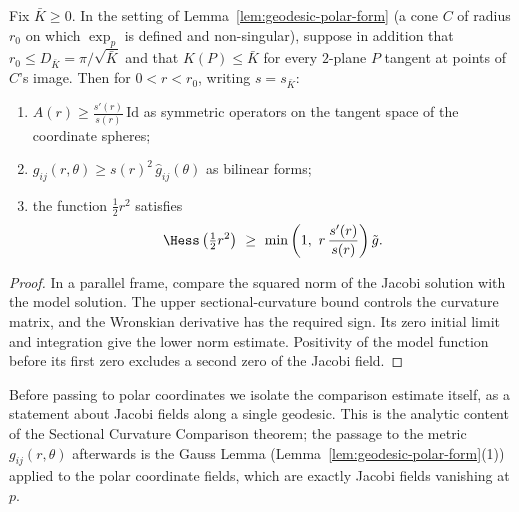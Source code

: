 \begin{lemma}
\label{lem:rauch-lower}

Fix $\bar K\ge0$. In the setting of
Lemma~\ref{lem:geodesic-polar-form} (a cone $C$ of radius $r_0$ on
which $\exp_p$ is defined and non-singular), suppose in addition
that $r_0\le D_{\bar K}=\pi/\sqrt{\bar K}$ and that $K(P)\le\bar K$
for every $2$-plane $P$ tangent at points of $C$'s image. Then for
$0<r<r_0$, writing $s=s_{\bar K}$:
\begin{enumerate}
\item $A(r)\ge\frac{s'(r)}{s(r)}\,\mathrm{Id}$ as symmetric
operators on the tangent space of the coordinate spheres;
\item $g_{ij}(r,\theta)\ge s(r)^2\,\hat g_{ij}(\theta)$ as
bilinear forms;
\item the function $\frac12r^2$ satisfies
$$\Hess\left(\tfrac12r^2\right)\ \ge\
\min\left(1,\ r\,\frac{s'(r)}{s(r)}\right)\tilde g .$$
\end{enumerate}
\end{lemma}

\begin{proof}
\sketch
{}
In a parallel frame, compare the squared norm of the Jacobi solution with the model solution. The upper sectional-curvature bound controls the curvature matrix, and the Wronskian derivative has the required sign. Its zero initial limit and integration give the lower norm estimate. Positivity of the model function before its first zero excludes a second zero of the Jacobi field.
\end{proof}

Before passing to polar coordinates we isolate the comparison estimate
itself, as a statement about Jacobi fields along a single geodesic.  This
is the analytic content of the Sectional Curvature Comparison theorem; the
passage to the metric $g_{ij}(r,\theta)$ afterwards is the Gauss Lemma
(Lemma~\ref{lem:geodesic-polar-form}(1)) applied to the polar coordinate
fields, which are exactly Jacobi fields vanishing at $p$.

